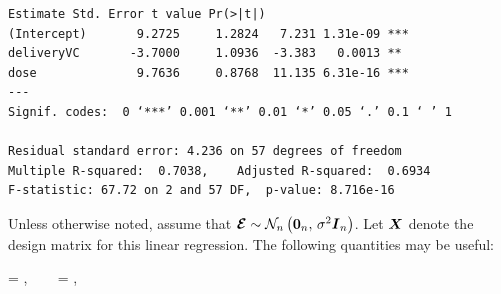 \documentclass[12pt]{article}
\begin{document}
\begin{Verbatim}[frame=single]
                Estimate Std. Error t value Pr(>|t|)    
(Intercept)       9.2725     1.2824   7.231 1.31e-09 ***
deliveryVC       -3.7000     1.0936  -3.383   0.0013 ** 
dose              9.7636     0.8768  11.135 6.31e-16 ***
---
Signif. codes:  0 ‘***’ 0.001 ‘**’ 0.01 ‘*’ 0.05 ‘.’ 0.1 ‘ ’ 1

Residual standard error: 4.236 on 57 degrees of freedom
Multiple R-squared:  0.7038,	Adjusted R-squared:  0.6934 
F-statistic: 67.72 on 2 and 57 DF,  p-value: 8.716e-16
\end{Verbatim}

\noindent Unless otherwise noted, assume that $\boldsymbol{\mathcal{E}} \sim \mathcal{N}_{n}\left(\boldsymbol{0}_n,\,\sigma^2 \boldsymbol{I}_n\right)$. 
Let $\boldsymbol{X}$ denote the design matrix for this linear regression. The following quantities may be useful:

\beqn
\XtX = , ~~~
\XtXinv = , 
\eeqn
\end{document}
